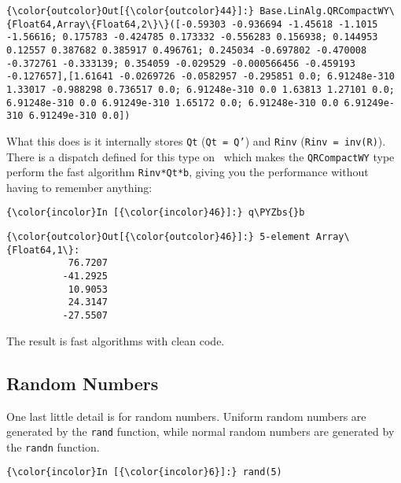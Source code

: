 \documentclass[11pt]{article}
\def\PYZbs{\char`\\}
\begin{document}
            \begin{Verbatim}[commandchars=\\\{\}]
{\color{outcolor}Out[{\color{outcolor}44}]:} Base.LinAlg.QRCompactWY\{Float64,Array\{Float64,2\}\}([-0.59303 -0.936694 -1.45618 -1.1015 -1.56616; 0.175783 -0.424785 0.173332 -0.556283 0.156938; 0.144953 0.12557 0.387682 0.385917 0.496761; 0.245034 -0.697802 -0.470008 -0.372761 -0.333139; 0.354059 -0.029529 -0.000566456 -0.459193 -0.127657],[1.61641 -0.0269726 -0.0582957 -0.295851 0.0; 6.91248e-310 1.33017 -0.988298 0.736517 0.0; 6.91248e-310 0.0 1.63813 1.27101 0.0; 6.91248e-310 0.0 6.91249e-310 1.65172 0.0; 6.91248e-310 0.0 6.91249e-310 6.91249e-310 0.0])
\end{Verbatim}
        
    What this does is it internally stores \texttt{Qt} (\texttt{Qt = Q'})
and \texttt{Rinv} (\texttt{Rinv = inv(R)}). There is a dispatch defined
for this type on ~which makes the \texttt{QRCompactWY} type perform the
fast algorithm \texttt{Rinv*Qt*b}, giving you the performance without
having to remember anything:

    \begin{Verbatim}[commandchars=\\\{\}]
{\color{incolor}In [{\color{incolor}46}]:} q\PYZbs{}b
\end{Verbatim}

            \begin{Verbatim}[commandchars=\\\{\}]
{\color{outcolor}Out[{\color{outcolor}46}]:} 5-element Array\{Float64,1\}:
           76.7207
          -41.2925
           10.9053
           24.3147
          -27.5507
\end{Verbatim}
        
    The result is fast algorithms with clean code.

    \subsection{Random Numbers}\label{random-numbers}

One last little detail is for random numbers. Uniform random numbers are
generated by the \texttt{rand} function, while normal random numbers are
generated by the \texttt{randn} function.

    \begin{Verbatim}[commandchars=\\\{\}]
{\color{incolor}In [{\color{incolor}6}]:} rand(5)
\end{Verbatim}
\end{document}
